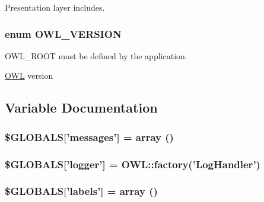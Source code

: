 Presentation layer includes. 

\subsubsection[{OWL\_\-VERSION}]{\setlength{\rightskip}{0pt plus 5cm}enum {\bf OWL\_\-VERSION}}\label{OWLloader_8php_ab34b15a08db8691330db97cccd4d6140}


OWL\_\-ROOT must be defined by the application. 

\hyperlink{classOWL}{OWL} version 

\subsection{Variable Documentation}
\subsubsection[{\$GLOBALS}]{\setlength{\rightskip}{0pt plus 5cm}\$GLOBALS\mbox{[}'messages'\mbox{]} = array ()}\label{OWLloader_8php_a65f2996116eed36e9ab25f254a470259}
\subsubsection[{\$GLOBALS}]{\setlength{\rightskip}{0pt plus 5cm}\$GLOBALS\mbox{[}'logger'\mbox{]} = OWL::factory('{\bf LogHandler}')}\label{OWLloader_8php_ad8f7743ae327face727dae55887c2a43}
\subsubsection[{\$GLOBALS}]{\setlength{\rightskip}{0pt plus 5cm}\$GLOBALS\mbox{[}'labels'\mbox{]} = array ()}\label{OWLloader_8php_a49e8feb96fae9cb6655df44ebad3ca2b}
